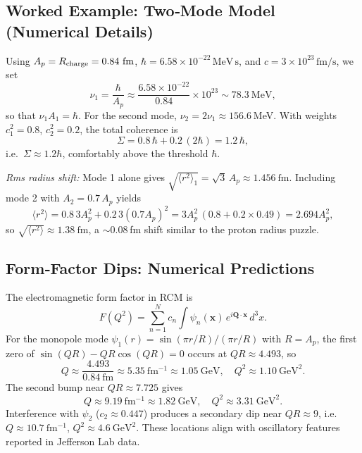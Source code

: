 \subsection{Worked Example: Two‐Mode Model (Numerical Details)}
Using \(A_p=R_{\rm charge}=0.84~\mathrm{fm}\), \(\hbar=6.58\times10^{-22}\,\mathrm{MeV\,s}\), and \(c=3\times10^{23}\,\mathrm{fm/s}\), we set
\[
\nu_1 = \frac{\hbar}{A_p} \approx \frac{6.58\times10^{-22}}{0.84}\times10^{23}
\sim 78.3~\mathrm{MeV},
\]
so that \(\nu_1A_1=\hbar\).  For the second mode, \(\nu_2=2\nu_1\approx156.6\) MeV.  With weights \(c_1^2=0.8\), \(c_2^2=0.2\), the total coherence is
\[
\Sigma =0.8\,\hbar +0.2\,(2\hbar) =1.2\,\hbar,
\]
i.e.\ \(\Sigma\approx1.2\hbar\), comfortably above the threshold \(\hbar\).

\bigskip
\noindent\emph{Rms radius shift:} Mode 1 alone gives \(\sqrt{\langle r^2\rangle_1}=\sqrt{3}\,A_p\approx1.456~\mathrm{fm}\).  Including mode 2 with \(A_2=0.7\,A_p\) yields
\[
\langle r^2\rangle = 0.8\,3A_p^2 +0.2\,3(0.7A_p)^2
=3A_p^2\,(0.8+0.2\times0.49)
=2.694A_p^2,
\]
so \(\sqrt{\langle r^2\rangle}\approx1.38~\mathrm{fm}\), a \(\sim0.08\) fm shift similar to the proton radius puzzle.

\subsection{Form‐Factor Dips: Numerical Predictions}
The electromagnetic form factor in RCM is
\begin{equation}\label{eq:form_factor}
F(Q^2) = \sum_{n=1}^N c_n \int \psi_n(\mathbf x)\,e^{i\mathbf Q\cdot\mathbf x}\,d^3x.
\end{equation}
For the monopole mode \(\psi_1(r)=\sin(\pi r/R)/(\pi r/R)\) with \(R=A_p\), the first zero of 
\(\sin(QR)-QR\cos(QR)=0\)
occurs at \(QR\approx4.493\), so
\[
Q \approx \frac{4.493}{0.84~\mathrm{fm}}\approx5.35~\mathrm{fm^{-1}}\approx1.05~\mathrm{GeV},
\quad Q^2\approx1.10~\mathrm{GeV}^2.
\]
The second bump near \(QR\approx7.725\) gives
\[
Q\approx9.19~\mathrm{fm^{-1}}\approx1.82~\mathrm{GeV},
\quad Q^2\approx3.31~\mathrm{GeV}^2.
\]
Interference with \(\psi_2\) (\(c_2\approx0.447\)) produces a secondary dip near \(QR\approx9\), i.e.\ 
\(Q\approx10.7~\mathrm{fm^{-1}}\), \(Q^2\approx4.6~\mathrm{GeV}^2\).  These locations align with oscillatory features reported in Jefferson Lab data.

